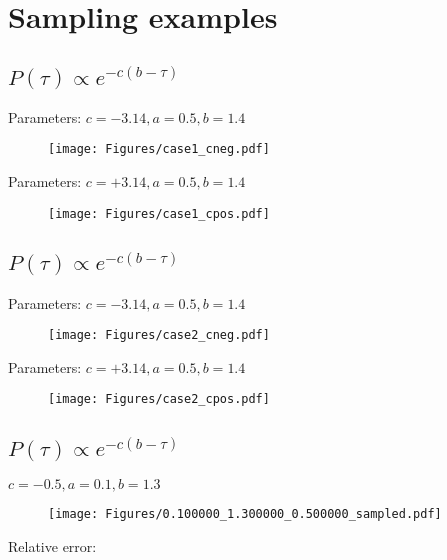 \documentclass[12pt, two sided]{article}
\begin{document}

\section{Sampling examples}

\subsection{$P(\tau) \propto e^{-c(b-\tau)}$}

Parameters: $ c=-3.14 , a = 0.5, b = 1.4$

\begin{figure}[h!]
\texttt{[image: Figures/case1\_cneg.pdf]}
\end{figure}

Parameters: $ c=+3.14 , a = 0.5, b = 1.4$

\begin{figure}[h!]
\texttt{[image: Figures/case1\_cpos.pdf]}
\end{figure}

\subsection{$P(\tau) \propto e^{-c(b-\tau)}$}

Parameters: $ c=-3.14 , a = 0.5, b = 1.4$

\begin{figure}[h!]
\texttt{[image: Figures/case2\_cneg.pdf]}
\end{figure}

Parameters: $ c=+3.14 , a = 0.5, b = 1.4$

\begin{figure}[h!]
\texttt{[image: Figures/case2\_cpos.pdf]}
\end{figure}

\subsection{$P(\tau) \propto e^{-c(b-\tau)}$}

$ c=-0.5 , a = 0.1, b = 1.3 $

\begin{figure}[h!]
\texttt{[image: Figures/0.100000\_1.300000\_0.500000\_sampled.pdf]}
\end{figure}

Relative error:
\end{document}
